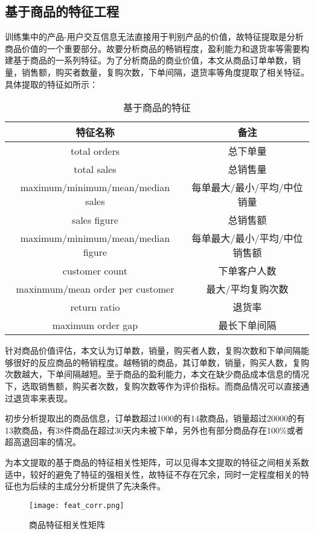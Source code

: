 \documentclass[lang=cn,11pt,a4paper,cite=authoryear]{elegantpaper}
\begin{document}
\subsection{基于商品的特征工程}

训练集中的产品-用户交互信息无法直接用于判别产品的价值，故特征提取是分析商品价值的一个重要部分。故要分析商品的畅销程度，盈利能力和退货率等需要构建基于商品的一系列特征。为了分析商品的商业价值，本文从商品订单单数，销量，销售额，购买者数量，复购次数，下单间隔，退货率等角度提取了相关特征。具体提取的特征如所示：

\begin{table}[!htb]
  \centering
  \caption{基于商品的特征}
    \huge
    \begin{tabular}{c|c}
    \hline
    \textbf{特征名称} & \textbf{备注} \\
    \hline
    total orders  & 总下单量 \\
    total sales    & 总销售量 \\
    maximum/minimum/mean/median sales & 每单最大/最小/平均/中位销量  \\
    sales figure   & 总销售额 \\
    maximum/minimum/mean/median figure & 每单最大/最小/平均/中位销售额 \\
    customer count & 下单客户人数 \\
    maxinmum/mean order per customer & 最大/平均复购次数 \\
    return ratio & 退货率 \\
    maximum order gap & 最长下单间隔 \\
    \hline
    \end{tabular}
  \label{基于商品的特征}
\end{table}

针对商品价值评估，本文认为订单数，销量，购买者人数，复购次数和下单间隔能够很好的反应商品的畅销程度。越畅销的商品，其订单数，销量，购买人数，复购次数越大，下单间隔越短。至于商品的盈利能力，本文在缺少商品成本信息的情况下，选取销售额，购买者次数，复购次数等作为评价指标。而商品情况可以直接通过退货率来表现。

初步分析提取出的商品信息，订单数超过1000的有14款商品，销量超过20000的有13款商品，有38件商品在超过30天内未被下单，另外也有部分商品存在100\%或者超高退回率的情况。

为本文提取的基于商品的特征相关性矩阵，可以见得本文提取的特征之间相关系数适中，较好的避免了特征的强相关性，故特征不存在冗余，同时一定程度相关的特征也为后续的主成分分析提供了先决条件。
\begin{figure}[H]
  \centering
  \texttt{[image: feat\_corr.png]}
  \caption{商品特征相关性矩阵}
  \label{商品特征相关性矩阵}
\end{figure}
\end{document}
